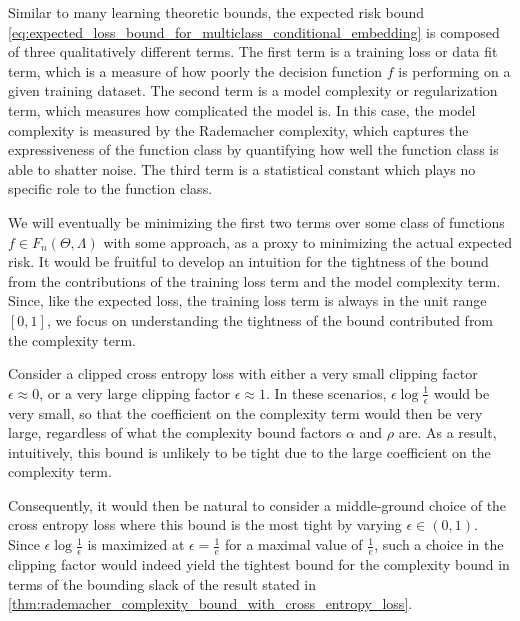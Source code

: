 \documentclass[runningheads, envcountsame, a4paper]{llncs}
\begin{document}
			Similar to many learning theoretic bounds, the expected risk bound \eqref{eq:expected_loss_bound_for_multiclass_conditional_embedding} is composed of three qualitatively different terms. The first term is a training loss or data fit term, which is a measure of how poorly the decision function $f$ is performing on a given training dataset. The second term is a model complexity or regularization term, which measures how complicated the model is. In this case, the model complexity is measured by the Rademacher complexity, which captures the expressiveness of the function class by quantifying how well the function class is able to shatter noise. The third term is a statistical constant which plays no specific role to the function class.
			
			We will eventually be minimizing the first two terms over some class of functions $f \in F_{n}(\Theta, \Lambda)$ with some approach, as a proxy to minimizing the actual expected risk. It would be fruitful to develop an intuition for the tightness of the bound from the contributions of the training loss term and the model complexity term. Since, like the expected loss, the training loss term is always in the unit range $[0, 1]$, we focus on understanding the tightness of the bound contributed from the complexity term.
			
			Consider a clipped cross entropy loss with either a very small clipping factor $\epsilon \approx 0$, or a very large clipping factor $\epsilon \approx 1$. In these scenarios, $\epsilon \log{\frac{1}{\epsilon}}$ would be very small, so that the coefficient on the complexity term would then be very large, regardless of what the complexity bound factors $\alpha$ and $\rho$ are. As a result, intuitively, this bound is unlikely to be tight due to the large coefficient on the complexity term.
			
			Consequently, it would then be natural to consider a middle-ground choice of the cross entropy loss where this bound is the most tight by varying $\epsilon \in (0, 1)$. Since $\epsilon \log{\frac{1}{\epsilon}}$ is maximized at $\epsilon = \frac{1}{e}$ for a maximal value of $\frac{1}{e}$, such a choice in the clipping factor would indeed yield the tightest bound for the complexity bound in terms of the bounding slack of the result stated in \cref{thm:rademacher_complexity_bound_with_cross_entropy_loss}.
			
\end{document}
